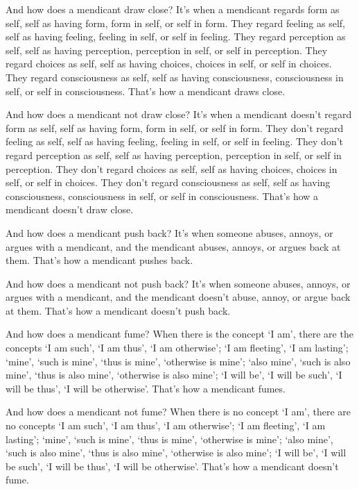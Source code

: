 \documentclass[12pt,openany]{book}%
\begin{document}
And how does a mendicant draw close? It’s when a mendicant regards form as self, self as having form, form in self, or self in form. They regard feeling as self, self as having feeling, feeling in self, or self in feeling. They regard perception as self, self as having perception, perception in self, or self in perception. They regard choices as self, self as having choices, choices in self, or self in choices. They regard consciousness as self, self as having consciousness, consciousness in self, or self in consciousness. That’s how a mendicant draws close. 

And how does a mendicant not draw close? It’s when a mendicant doesn’t regard form as self, self as having form, form in self, or self in form. They don’t regard feeling as self, self as having feeling, feeling in self, or self in feeling. They don’t regard perception as self, self as having perception, perception in self, or self in perception. They don’t regard choices as self, self as having choices, choices in self, or self in choices. They don’t regard consciousness as self, self as having consciousness, consciousness in self, or self in consciousness. That’s how a mendicant doesn’t draw close. 

And how does a mendicant push back? It’s when someone abuses, annoys, or argues with a mendicant, and the mendicant abuses, annoys, or argues back at them. That’s how a mendicant pushes back. 

And how does a mendicant not push back? It’s when someone abuses, annoys, or argues with a mendicant, and the mendicant doesn’t abuse, annoy, or argue back at them. That’s how a mendicant doesn’t push back. 

And how does a mendicant fume? When there is the concept ‘I am’, there are the concepts ‘I am such’, ‘I am thus’, ‘I am otherwise’; ‘I am fleeting’, ‘I am lasting’; ‘mine’, ‘such is mine’, ‘thus is mine’, ‘otherwise is mine’; ‘also mine’, ‘such is also mine’, ‘thus is also mine’, ‘otherwise is also mine’; ‘I will be’, ‘I will be such’, ‘I will be thus’, ‘I will be otherwise’. That’s how a mendicant fumes. 

And how does a mendicant not fume? When there is no concept ‘I am’, there are no concepts ‘I am such’, ‘I am thus’, ‘I am otherwise’; ‘I am fleeting’, ‘I am lasting’; ‘mine’, ‘such is mine’, ‘thus is mine’, ‘otherwise is mine’; ‘also mine’, ‘such is also mine’, ‘thus is also mine’, ‘otherwise is also mine’; ‘I will be’, ‘I will be such’, ‘I will be thus’, ‘I will be otherwise’. That’s how a mendicant doesn’t fume. 
\end{document}

